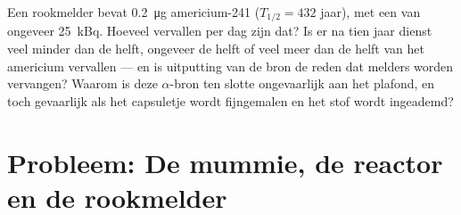 \begin{exercise}[$\star\star\star$]\label{exo:g11:nucleus-radioactivity:15}
Een rookmelder bevat \qty{0.2}{\micro\gram} americium-241
($T_{1/2} = 432$ jaar), met een  van ongeveer \qty{25}{kBq}.
Hoeveel vervallen per dag zijn dat? Is er na tien jaar dienst veel minder
dan de helft, ongeveer de helft of veel meer dan de helft van het
americium vervallen --- en is uitputting van de bron de reden dat
melders worden vervangen? Waarom is deze $\alpha$-bron ten slotte
ongevaarlijk aan het plafond, en toch gevaarlijk als het capsuletje wordt
fijngemalen en het stof wordt ingeademd?
\end{exercise}

\section{Probleem: De mummie, de reactor en de rookmelder}


